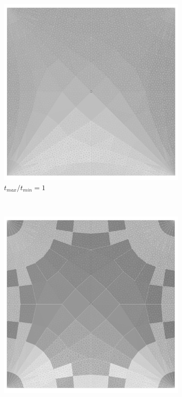 \begin{figure}[H]
\begin{subfigure}[b]{.32\textwidth}
  \centering
  \includegraphics[width=.99\linewidth]{images/t_opt_l2d15_gamma1}
  \caption{$t_{max}/t_{min}=1$}
\end{subfigure}
~
\begin{subfigure}[b]{.32\textwidth}
  \centering
  \includegraphics[width=.99\linewidth]{images/t_opt_l2d15_gamma2}

\end{subfigure}
\end{figure}
